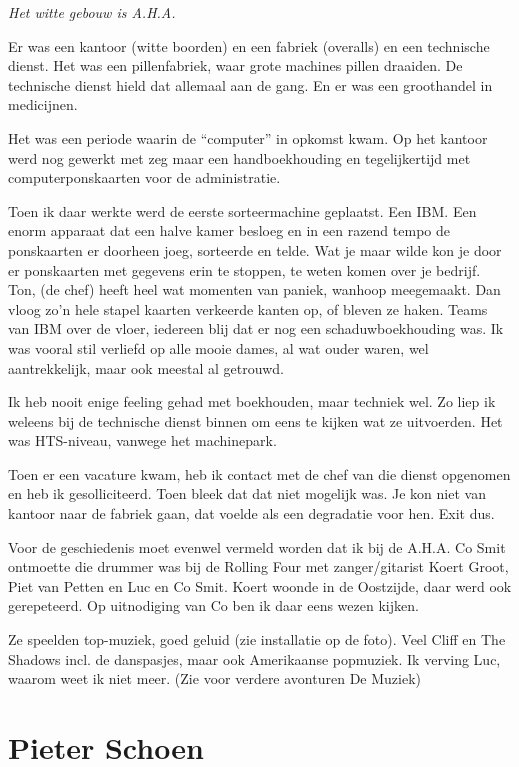 \documentclass[10pt,twoside,openright]{memoir}
\begin{document}
\emph{Het witte gebouw is A.H.A.}

Er was een kantoor (witte boorden) en een fabriek (overalls) en een technische dienst. Het was een pillenfabriek, waar grote machines pillen draaiden. De technische dienst hield dat allemaal aan de gang. En er was een groothandel in medicijnen. 

Het was een periode waarin de “computer” in opkomst kwam. Op het kantoor werd nog gewerkt met zeg maar een handboekhouding en tegelijkertijd met computerponskaarten voor de administratie. 

Toen ik daar werkte werd de eerste sorteermachine geplaatst. Een IBM. Een enorm apparaat dat een halve kamer besloeg en in een razend tempo de ponskaarten er doorheen joeg, sorteerde en telde. Wat je maar wilde kon je door er ponskaarten met gegevens erin te stoppen, te weten komen over je bedrijf. Ton, (de chef) heeft heel wat momenten van paniek, wanhoop meegemaakt. Dan vloog zo’n hele stapel kaarten verkeerde kanten op, of bleven ze haken. Teams van IBM over de vloer, iedereen blij dat er nog een schaduwboekhouding was. Ik was vooral stil verliefd op alle mooie dames, al wat ouder waren, wel aantrekkelijk, maar ook meestal al getrouwd. 

Ik heb nooit enige feeling gehad met boekhouden, maar techniek wel. Zo liep ik weleens bij de technische dienst binnen om eens te kijken wat ze uitvoerden. Het was HTS-niveau, vanwege het machinepark. 

Toen er een vacature kwam, heb ik contact met de chef van die dienst opgenomen en heb ik gesolliciteerd. Toen bleek dat dat niet mogelijk was. Je kon niet van kantoor naar de fabriek gaan, dat voelde als een degradatie voor hen. Exit dus.

Voor de geschiedenis moet evenwel vermeld worden dat ik bij de A.H.A. Co Smit ontmoette die drummer was bij de Rolling Four met zanger/gitarist Koert Groot, Piet van Petten en Luc en Co Smit. Koert woonde in de Oostzijde, daar werd ook gerepeteerd. Op uitnodiging van Co ben ik daar eens wezen kijken. 

Ze speelden top-muziek, goed geluid (zie installatie op de foto). Veel Cliff en The Shadows incl. de danspasjes, maar ook Amerikaanse popmuziek. Ik verving Luc, waarom weet ik niet meer. (Zie voor verdere avonturen De Muziek)

\chapter{Pieter Schoen} %
\label{cha:schoen}
\end{document}

